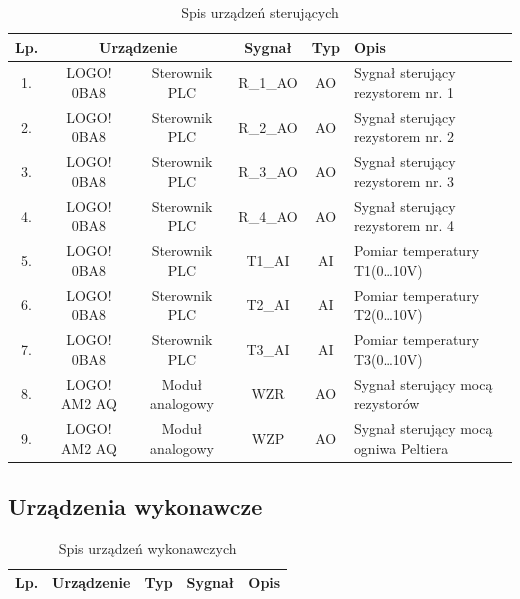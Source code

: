 \documentclass[oneside]{mgr}
\begin{document}
\begin{table}[h]
\centering
\begin{tabularx}{\textwidth}{|c|c|c|c|c|X|}
\hline
\rowcolor{lightgray}
    Lp. & \multicolumn{2}{|c|}{Urządzenie}        & Sygnał    & Typ         & Opis                              \\\hline
    1.  &  LOGO! 0BA8       & Sterownik PLC       & R\_1\_AO  & AO          & Sygnał sterujący \newline rezystorem nr. 1 \\\hline
    2.  &  LOGO! 0BA8       & Sterownik PLC       & R\_2\_AO  & AO          & Sygnał sterujący \newline rezystorem nr. 2 \\\hline
    3.  &  LOGO! 0BA8       & Sterownik PLC       & R\_3\_AO  & AO          & Sygnał sterujący \newline rezystorem nr. 3 \\\hline
    4.  &  LOGO! 0BA8       & Sterownik PLC       & R\_4\_AO  & AO          & Sygnał sterujący \newline rezystorem nr. 4 \\\hline
    5.  &  LOGO! 0BA8       & Sterownik PLC       & T1\_AI    & AI          & Pomiar temperatury T1(0\dots10V)           \\\hline
    6.  &  LOGO! 0BA8       & Sterownik PLC       & T2\_AI    & AI          & Pomiar temperatury T2(0\dots10V)           \\\hline
    7.  &  LOGO! 0BA8       & Sterownik PLC       & T3\_AI    & AI          & Pomiar temperatury T3(0\dots10V)           \\\hline
    8.  &  LOGO! AM2 AQ     & Moduł analogowy     & WZR       & AO          & Sygnał sterujący mocą rezystorów           \\\hline
    9.  &  LOGO! AM2 AQ     & Moduł analogowy     & WZP       & AO          & Sygnał sterujący mocą ogniwa Peltiera      \\\hline
\end{tabularx}
   \caption{Spis urządzeń sterujących}
\end{table}

\subsection{Urządzenia wykonawcze}

\begin{table}[h]
\begin{center}
\begin{tabular}{|c|c|c|c|c|c|}
\hline
    Lp. & \multicolumn{2}{|c|}{Urządzenie} & Typ & Sygnał & Opis \\\hline
\end{tabular}
   \caption{Spis urządzeń wykonawczych}
\end{center}
\end{table}
\end{document}
